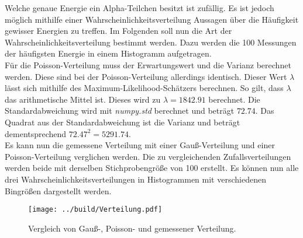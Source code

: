 \noindent Welche genaue Energie ein Alpha-Teilchen besitzt ist zufällig. Es ist jedoch möglich mithilfe einer 
Wahrscheinlichkeitsverteilung Aussagen über die Häufigkeit gewisser Energien zu treffen. Im Folgenden soll nun die Art 
der Wahrscheinlichkeitsverteilung bestimmt werden. Dazu werden die 100 Messungen der häufigsten Energie in einem 
Histogramm aufgetragen. \\
\noindent Für die Poisson-Verteilung muss der Erwartungswert und die Varianz berechnet werden. Diese sind bei der 
Poisson-Verteilung allerdings identisch. Dieser Wert $\lambda$ lässt sich mithilfe des Maximum-Likelihood-Schätzers 
berechnen. So gilt, dass $\lambda$ das arithmetische Mittel ist. Dieses wird zu $\lambda = 1842.91$ berechnet.
Die Standardabweichung wird mit \emph{numpy.std} berechnet und beträgt $72.74$. Das Quadrat aus der Standardabweichung ist 
die Varianz und beträgt dementsprechend $72.47^2 = 5291.74$. \\
\noindent Es kann nun die gemessene Verteilung mit einer Gauß-Verteilung und einer Poisson-Verteilung verglichen werden. 
Die zu vergleichenden Zufallsverteilungen werden beide mit derselben Stichprobengröße von 100 erstellt. Es können nun 
alle drei Wahrscheinlichkeitsverteilungen in Histogrammen mit verschiedenen Bingrößen dargestellt werden.

\begin{figure*}
    \texttt{[image: ../build/Verteilung.pdf]}
    \caption{Vergleich von Gauß-, Poisson- und gemessener Verteilung.}
\end{figure*}




